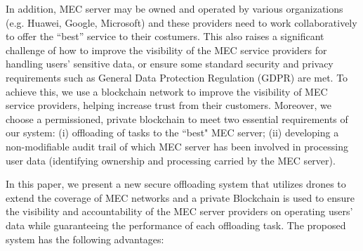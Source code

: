 In addition, MEC server may be owned and operated by various organizations (e.g. Huawei, Google, Microsoft) and these providers need to work collaboratively to offer the ``best'' service to their costumers. This also raises a significant challenge of how to improve the visibility of the MEC service providers for handling users' sensitive data, or ensure some standard security and privacy requirements such as General Data Protection Regulation (GDPR) are met.  To achieve this, we use a blockchain network to improve the visibility of MEC service providers, helping increase trust from their customers. Moreover, we choose a permissioned, private blockchain to meet two essential requirements of our system: (i) offloading of tasks to the ``best" MEC server; (ii) developing a non-modifiable audit trail of which MEC server has been involved in processing user data (identifying ownership and processing carried by the MEC server). 

In this paper, we present a new secure offloading system that utilizes drones to extend the coverage of MEC networks and a private Blockchain is used to ensure the visibility and accountability of the MEC server providers on operating users' data while guaranteeing the performance of each offloading task. The proposed system has the following advantages:


